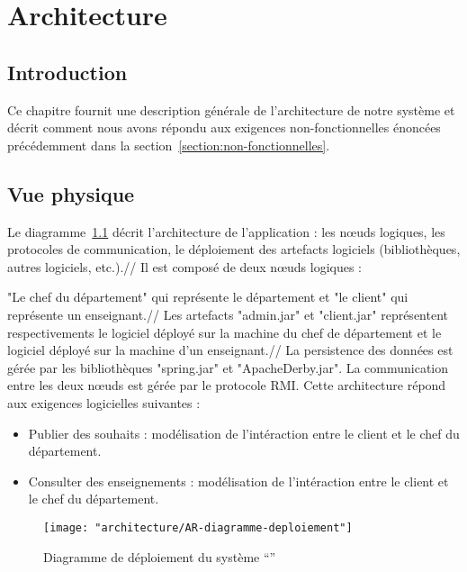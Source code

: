 
\chapter{Architecture}

\section{Introduction} 
    
    Ce chapitre fournit une description générale de l'architecture de notre système et décrit comment nous avons répondu aux exigences non-fonctionnelles énoncées précédemment dans la section~\ref{section:non-fonctionnelles}.

\section{Vue physique} 

    Le diagramme~\ref{dgm-deploiement} décrit l'architecture de l'application : les nœuds logiques, les protocoles de communication, le déploiement des artefacts logiciels (bibliothèques, autres logiciels, etc.).//
    Il est composé de deux nœuds logiques : 

    "Le chef du département" qui représente le département et "le client" qui représente un enseignant.//
    Les artefacts "admin.jar" et "client.jar" représentent respectivements le logiciel déployé sur la machine du chef de département et le logiciel déployé sur la machine d'un enseignant.//
    La persistence des données est gérée par les bibliothèques "spring.jar" et "ApacheDerby.jar". La communication entre les deux nœuds est gérée par le protocole RMI. Cette architecture répond aux exigences logicielles suivantes : 
    \begin{itemize}
        \item Publier des souhaits : modélisation de l'intéraction entre le client et le chef du département.
        \item Consulter des enseignements : modélisation de l'intéraction entre le client et le chef du département.
    \end{itemize}
    
    \begin{figure}[h]
    \begin{center}
    \texttt{[image: "architecture/AR-diagramme-deploiement"]}
    \caption{Diagramme de déploiement du système ``\projet{}''}
    \label{dgm-deploiement}
    \end{center}
    \end{figure} 
    
